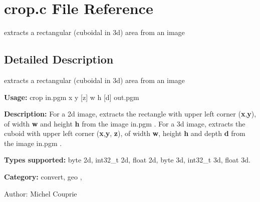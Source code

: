 \section{crop.c File Reference}
\label{crop_8c}
extracts a rectangular (cuboidal in 3d) area from an image 



\subsection{Detailed Description}
extracts a rectangular (cuboidal in 3d) area from an image 

{\bf Usage:} crop in.pgm x y [z] w h [d] out.pgm

{\bf Description:} For a 2d image, extracts the rectangle with upper left corner ({\bf x},{\bf y}), of width {\bf w} and height {\bf h} from the image in.pgm . For a 3d image, extracts the cuboid with upper left corner ({\bf x},{\bf y}, {\bf z}), of width {\bf w}, height {\bf h} and depth {\bf d} from the image in.pgm .

{\bf Types supported:} byte 2d, int32\_\-t 2d, float 2d, byte 3d, int32\_\-t 3d, float 3d.

{\bf Category:} convert, geo ,

\begin{Desc}
\item[Author:]Michel Couprie \end{Desc}
